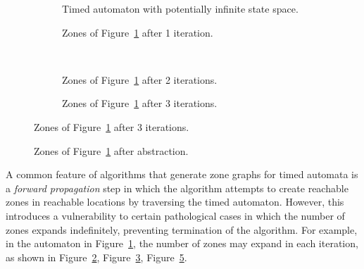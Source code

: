 \begin{figure}
  \centering
  \caption{Timed automaton with a potentially infinite
    set of zones, example taken from \cite{Behrmann03staticguard}.}
  \label{breaking2withzones}
  \begin{subfigure}[b]{0.5\textwidth}
    \centering
    \def\svgwidth{\columnwidth}
    
    \caption{Timed automaton with potentially infinite state space.}
    \label{breaking2}
  \end{subfigure}%

  \begin{subfigure}[b]{0.3\textwidth}
    \centering
    \def\svgwidth{\columnwidth}
    
    \caption{Zones of Figure~\ref{breaking2} after 1 iteration.}
    \label{breaking2-zones01}
  \end{subfigure}
  ~ %
  \begin{subfigure}[b]{0.6\textwidth}
    \centering
    \def\svgwidth{\columnwidth}
    
    \caption{Zones of Figure~\ref{breaking2} after 2 iterations.}
    \label{breaking2-zones02}
  \end{subfigure}

  \begin{subfigure}[b]{\textwidth}
    \centering
    \def\svgwidth{0.9\columnwidth}
    
    \caption{Zones of Figure~\ref{breaking2} after 3 iterations.}
    \label{breaking2-zones03}
  \end{subfigure}
\end{figure}

\begin{figure}
  \centering
  \def\svgwidth{0.9\columnwidth}
  
  \caption{Zones of Figure~\ref{breaking2} after abstraction.}
\end{figure}

A common feature of algorithms that generate zone graphs for timed
automata is a \emph{forward propagation} step in which the algorithm attempts to
create reachable zones in reachable locations by traversing the timed
automaton. However, this introduces a vulnerability to certain
pathological cases in which the number of zones expands indefinitely,
preventing termination of the algorithm. For example, in the automaton in
Figure~\ref{breaking2}, the number of zones may expand in each
iteration, as shown in Figure~\ref{breaking2-zones01},
Figure~\ref{breaking2-zones02}, Figure~\ref{breaking2-zones03}.

